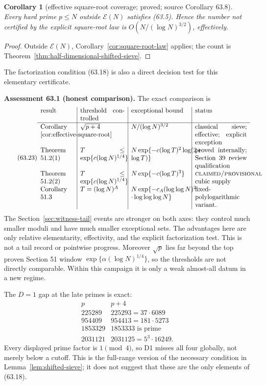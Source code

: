 \documentclass[10pt,reqno]{amsart}
\newtheorem{corollary}[theorem]{Corollary}
\theoremstyle{definition}
\newcommand{\1}{\mathbf 1}
\begin{document}
\begin{corollary}[effective square-root coverage; proved; source Corollary 63.8]
\label{cor:effective-square-root}
Every hard prime $p\leq N$ outside $\mathcal E(N)$ satisfies
(63.5).  Hence the number not certified by the explicit square-root
law is $O(N/(\log N)^{3/2})$, effectively.
\end{corollary}
\begin{proof}
Outside $\mathcal E(N)$, Corollary~\ref{cor:square-root-law} applies; the
count is Theorem~\ref{thm:half-dimensional-shifted-sieve}.
\end{proof}
The factorization condition (63.18) is also a direct decision test for
this elementary certificate.

\medskip\noindent\textbf{Assessment 63.1 (honest comparison).}
The exact comparison is
\begingroup\scriptsize
\begin{equation}\tag{63.23}
\begin{array}{p{18mm}|p{24mm}|p{31mm}|p{28mm}}
result&threshold controlled&exceptional bound&status\\ \hline
Corollary \ref{cor:effective-square-root}&$\sqrt{p+4}$&
 $N/(\log N)^{3/2}$&classical sieve; effective; explicit exception\\
Theorem 51.2(1)&$T\leq\exp\{c(\log N)^{1/4}\}$&
 $N\exp\{-c(\log T)^2\log(2+\log T)\}$&
 proved internally; Section 39 review qualification\\
Theorem 51.2(2)&$T\leq\exp\{c(\log N)^{1/4}\}$&
 $N\exp\{-c(\log T)^3\}$&\textsc{claimed/provisional} cubic supply\\
Corollary 51.3&$T=(\log N)^A$&
 $N\exp\{-c_A(\log\log N)^2$\newline
 $\mathbin\cdot\log\log\log N\}$&fixed-polylogarithmic variant.
\end{array}
\end{equation}
\endgroup
The Section~\ref{sec:witness-tail} events are stronger on both axes: they
control much smaller moduli and have much smaller exceptional sets.  The
advantages here are only relative elementarity, effectivity, and the
explicit factorization test.  This is not a tail record or pointwise
progress.  Moreover $\sqrt p$ lies far beyond the top proven Section 51
window $\exp\{\alpha(\log N)^{1/4}\}$, so the thresholds are not directly
comparable.  Within this campaign it is only a weak almost-all datum in a
new regime.

The $D=1$ gap at the late primes is exact:
\begin{equation}\tag{63.24}
\begin{array}{r|l}
p&p+4\\ \hline
225289&225293=37\cdot6089\\
954409&954413=181\cdot5273\\
1853329&1853333\text{ is prime}\\
2031121&2031125=5^3\cdot16249.
\end{array}
\end{equation}
Every displayed prime factor is $1\pmod4$, so D1 misses all four globally,
not merely below a cutoff.  This is the full-range version of the necessary
condition in Lemma~\ref{lem:shifted-sieve}; it does not suggest that these
are the only elements of (63.18).
\end{document}
